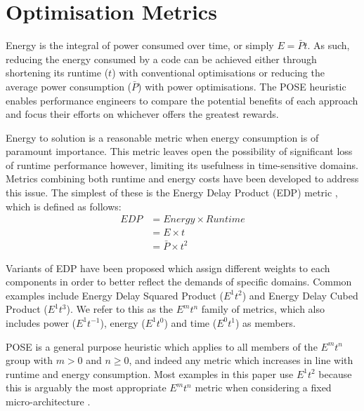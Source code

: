 \section{Optimisation Metrics}
\label{sec:metrics}
\noindent
Energy is the integral of power consumed over time, or simply $E = \bar{P}t$.
As such, reducing the energy consumed by a code can be achieved either through shortening its runtime ($t$) with conventional optimisations or reducing the average power consumption ($\bar{P}$) with power optimisations.
The POSE heuristic enables performance engineers to compare the potential benefits of each approach and focus their efforts on whichever offers the greatest rewards.

Energy to solution is a reasonable metric when energy consumption is of paramount importance.
This metric leaves open the possibility of significant loss of runtime performance however, limiting its usefulness in time-sensitive domains.
Metrics combining both runtime and energy costs have been developed to address this issue. 
The simplest of these is the Energy Delay Product (EDP) metric \cite{gonzales:1996aa}, which is defined as follows:
\begin{align}
  EDP &= Energy \times Runtime \nonumber \\
      &= E \times t \nonumber \\
      &= \bar{P} \times t^2
  \label{eq:edp}
\end{align}

Variants of EDP have been proposed which assign different weights to each components in order to better reflect the demands of specific domains.
Common examples include Energy Delay Squared Product ($E^1t^{2}$) and Energy Delay Cubed Product ($E^1t^{3}$).
We refer to this as the $E^mt^n$ family of metrics, which also includes power ($E^1t^{-1}$), energy ($E^1t^0$) and time ($E^0t^1$) as members.

POSE is a general purpose heuristic which applies to all members of the $E^mt^n$ group with $m > 0$ and $n \geq 0$, and indeed any metric which increases in line with runtime and energy consumption.
Most examples in this paper use $E^1t^2$ because this is arguably the most appropriate $E^mt^n$ metric when considering a fixed micro-architecture \cite{brooks:2000aa}.
